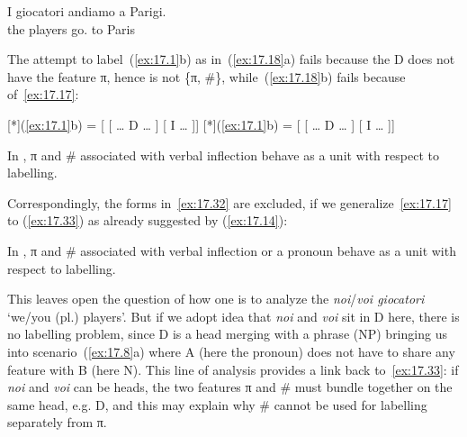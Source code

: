 \documentclass[output=paper]{langsci/langscibook}
\begin{document}
\begin{exe}
    \gll I giocatori andiamo a Parigi.\\
    the players go.\Fpl{} to Paris\\
    \glt
\end{exe}
The attempt to label~(\ref{ex:17.1}b) as in~(\ref{ex:17.18}a) fails
because the D does not have the feature π, hence is not \{π, \#\},
while~(\ref{ex:17.18}b) fails because of~\eqref{ex:17.17}:

\begin{exe}
\exi{\eqref{ex:17.18}}
\begin{xlist}
    [*]{(\ref{ex:17.1}b) = [\tss{\{} [ \dots{} D\tss{\#} \dots{} ] [ I\tss{\{}\tss{,\#\}} \dots{} ]]}
    [*]{(\ref{ex:17.1}b)  = [ [ \dots{} D\tss{\#} \dots{} ] [ I\tss{\{}\tss{,\#\}} \dots{} ]]}
\end{xlist}
\end{exe}

\begin{exe}
\exi{\eqref{ex:17.17}}
    In , π and \# associated with verbal inflection behave as a unit
    with respect to labelling.
\end{exe}
Correspondingly, the forms in~\eqref{ex:17.32} are excluded, if we
generalize~\eqref{ex:17.17} to (\ref{ex:17.33}) as already suggested by
(\ref{ex:17.14}):

\ea\label{ex:17.33}
    In , π and \# associated with verbal inflection or a pronoun behave
    as a unit with respect to labelling.
\z

\ea\label{ex:17.34}
    \z
\z
This leaves open the question of how one is to analyze the 
\emph{noi}/\emph{voi giocatori} ‘we/you (pl.) players’. But if we adopt
 idea that \emph{noi} and \emph{voi} sit in D here, there is
no labelling problem, since D is a head merging with a phrase
(NP) bringing us into scenario~(\ref{ex:17.8}a) where A (here the pronoun)
does not have to share any feature with B (here N). This line of analysis
provides a link back to~\eqref{ex:17.33}: if \emph{noi} and \emph{voi} can
be heads, the two features π and \# must bundle together on the same head, e.g.
D, and this may explain why \# cannot be used for labelling
separately from π.
\end{document}
